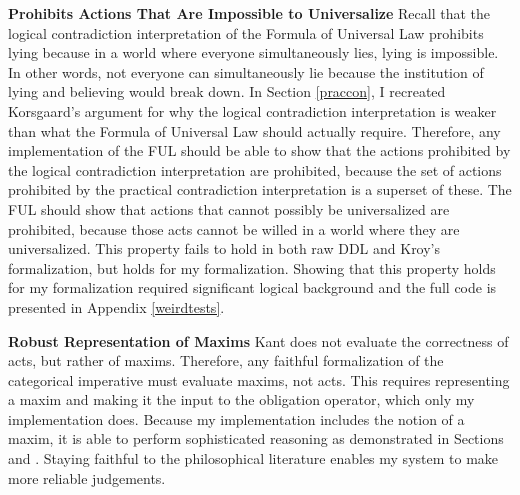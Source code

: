 \begin{isabellebody}
\begin{isamarkuptext}
\noindent \textbf{Prohibits Actions That Are Impossible to Universalize} Recall that 
the logical contradiction interpretation of the Formula of Universal Law prohibits lying because in a world 
where everyone simultaneously lies, lying is impossible. In other words, not everyone can simultaneously
lie because the institution of lying and believing would break down. In Section \ref{praccon}, 
I recreated Korsgaard's argument for why the logical contradiction interpretation is weaker than what the
Formula of Universal Law should actually require. Therefore, any implementation of the FUL should be 
able to show that the actions prohibited by the logical contradiction interpretation are prohibited, 
because the set of actions prohibited by the practical contradiction interpretation is a superset of these.
The FUL should show that actions that cannot possibly be universalized are prohibited, because those acts cannot be willed in 
a world where they are universalized. This property fails to hold in both raw DDL
and Kroy's formalization, but holds for my formalization. Showing that this property holds
for my formalization required significant logical background and the full code is presented in Appendix \ref{weirdtests}.%
\end{isamarkuptext}\isamarkuptrue%
%
\begin{isamarkuptext}%
\noindent \textbf{Robust Representation of Maxims} Kant does not evaluate the correctness of acts, but rather of maxims. Therefore, any 
faithful formalization of the categorical imperative must evaluate maxims, not acts. This requires 
representing a maxim and making it the input to the obligation operator, which only my implementation 
does. Because my implementation includes the notion of a maxim, it is able to perform sophisticated 
reasoning as demonstrated in Sections  and . Staying faithful to the philosophical 
literature enables my system to make more reliable judgements.


\end{isamarkuptext}
\end{isabellebody}
